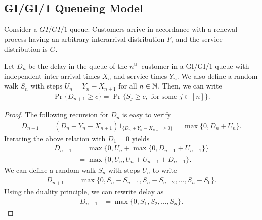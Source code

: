 \documentclass[a4paper,10pt,english]{article}
\begin{document}
\subsection{ GI/GI/1 Queueing Model}
Consider a $GI/GI/1$ queue. Customers arrive in accordance with a renewal process having an arbitrary interarrival distribution  $F$, and the service distribution is $G$. %
\begin{prop}
\label{prop_gigi1}
Let $D_n$ be the delay in the queue of the $n^\text{th}$ customer in a GI/GI/1 queue with independent inter-arrival times $X_n$ and service times $Y_n$. We also define a random walk $S_n$ with steps $U_n = Y_n - X_{n+1}$ for all $n \in \mathbb{N}$. 
Then, we can write
\begin{align}
\label{GIGI1_prop_eqn}
\Pr\{D_{n+1} \geq c\} = \Pr\{S_j \geq c, \text{ for some }j \in [n]\}.
\end{align}
\end{prop}
\begin{proof}
The following recursion for $D_n$ is easy to verify
\begin{align*}
 D_{n+1} &= (D_n+Y_n-X_{n+1})1_{\{D_n+Y_n - X_{n+1} \geq 0\}} = \max\{0,D_n+U_n\}.
\end{align*}
Iterating the above relation with $D_1 = 0$ yields
\begin{align*}
D_{n+1}&= \max\{0,U_n+\max\{0,D_{n-1}+U_{n-1}\}\}\\
&=\max\{0,U_n,U_n+U_{n-1}+D_{n-1}\}.
\end{align*}
We can define a random walk $S_n$ with steps $U_n$ to write 
\begin{align*}
D_{n+1} &=\max\{0,S_n-S_{n-1},S_n-S_{n-2}, \ldots, S_n - S_0\}.
\end{align*}
Using the duality principle, we can rewrite delay as 
\begin{align*}
D_{n+1} &=\max\{0,S_1,S_2, \ldots , S_n\}.
\end{align*}
\end{proof}
\end{document}
